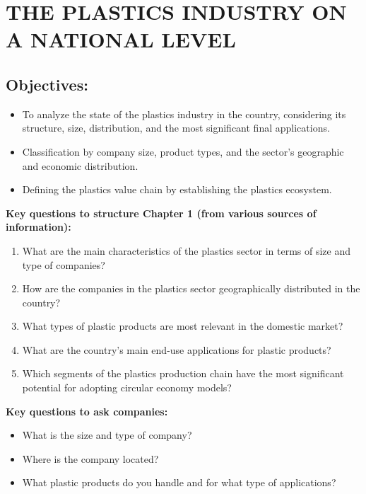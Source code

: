\documentclass[
  12pt,
  oneside]{book}
\providecommand{\tightlist}{%
  \setlength{\itemsep}{0pt}\setlength{\parskip}{0pt}}
\begin{document}
\section{THE PLASTICS INDUSTRY ON A NATIONAL
LEVEL}\label{the-plastics-industry-on-a-national-level}

\subsection{Objectives:}\label{objectives-1}

\begin{itemize}
\tightlist
\item
  To analyze the state of the plastics industry in the country,
  considering its structure, size, distribution, and the most
  significant final applications.
\item
  Classification by company size, product types, and the sector's
  geographic and economic distribution.
\item
  Defining the plastics value chain by establishing the plastics
  ecosystem.
\end{itemize}

\textbf{Key questions to structure Chapter 1 (from various sources of
information):}

\begin{enumerate}
\def\labelenumi{\arabic{enumi}.}
\tightlist
\item
  What are the main characteristics of the plastics sector in terms of
  size and type of companies?
\item
  How are the companies in the plastics sector geographically
  distributed in the country?
\item
  What types of plastic products are most relevant in the domestic
  market?
\item
  What are the country's main end-use applications for plastic products?
\item
  Which segments of the plastics production chain have the most
  significant potential for adopting circular economy models?
\end{enumerate}

\textbf{Key questions to ask companies:}

\begin{itemize}
\tightlist
\item
  What is the size and type of company?
\item
  Where is the company located?
\item
  What plastic products do you handle and for what type of applications?
\end{itemize}
\end{document}
